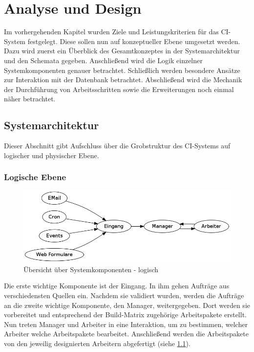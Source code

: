 \chapter{Analyse und Design}
\label{chap:design}

Im vorhergehenden Kapitel wurden Ziele und Leistungskriterien
für das \ac{CI}-System festgelegt.
Diese sollen nun auf konzeptueller Ebene umgesetzt werden.
Dazu wird zuerst ein Überblick des Gesamtkonzeptes in der Systemarchitektur und den Schemata gegeben.
Anschließend wird die Logik einzelner Systemkomponenten genauer betrachtet.
Schließlich werden besondere Ansätze zur Interaktion mit der Datenbank betrachtet.
Abschließend wird die Mechanik der Durchführung von Arbeitsschritten sowie die Erweiterungen noch einmal näher betrachtet.



\section{Systemarchitektur}
\label{sec:design:sysarch}
Dieser Abschnitt gibt Aufschluss über die Grobstruktur des \ac{CI}-Systems auf logischer und physischer Ebene.

\subsection{Logische Ebene}

\begin{figure}[ht]
  \centering
  \includegraphics[width=\textwidth]{imageinput/grob-layout-komponenten-logisch.png}
  \caption{\"Ubersicht über Systemkomponenten - logisch}
  \label{fig:grob-layout-komponenten-logisch}
\end{figure}


Die erste wichtige Komponente ist der Eingang.
In ihm gehen Aufträge aus verschiedensten Quellen ein.
Nachdem sie validiert wurden, werden die Aufträge an
die zweite wichtige Komponente, den Manager, weitergegeben.
Dort werden sie vorbereitet und entsprechend der Build-Matrix zugehörige Arbeitspakete erstellt.
Nun treten Manager und Arbeiter in eine Interaktion,
um zu bestimmen, welcher Arbeiter welche Arbeitspakete bearbeitet.
Anschließend werden die Arbeitspakete von den jeweilig designierten Arbeitern abgefertigt (siehe \cref{fig:grob-layout-komponenten-logisch}).

